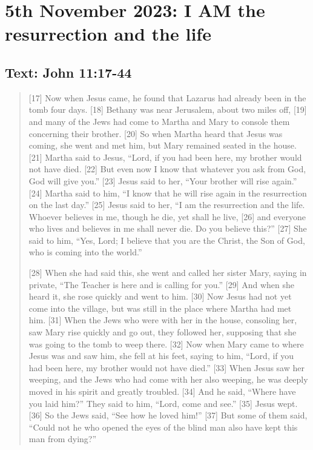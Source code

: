 \setcounter{figure}{0}

\section{5th November 2023: I AM the resurrection and the life}
\subsection*{Text: John 11:17-44}
  \begin{quote}
    [17] Now when Jesus came, he found that Lazarus had already been in the tomb four days. [18] Bethany was near Jerusalem, about two miles off, [19] and many of the Jews had come to Martha and Mary to console them concerning their brother. [20] So when Martha heard that Jesus was coming, she went and met him, but Mary remained seated in the house. [21] Martha said to Jesus, “Lord, if you had been here, my brother would not have died. [22] But even now I know that whatever you ask from God, God will give you.” [23] Jesus said to her, “Your brother will rise again.” [24] Martha said to him, “I know that he will rise again in the resurrection on the last day.” [25] Jesus said to her, “I am the resurrection and the life. Whoever believes in me, though he die, yet shall he live, [26] and everyone who lives and believes in me shall never die. Do you believe this?” [27] She said to him, “Yes, Lord; I believe that you are the Christ, the Son of God, who is coming into the world.”

    [28] When she had said this, she went and called her sister Mary, saying in private, “The Teacher is here and is calling for you.” [29] And when she heard it, she rose quickly and went to him. [30] Now Jesus had not yet come into the village, but was still in the place where Martha had met him. [31] When the Jews who were with her in the house, consoling her, saw Mary rise quickly and go out, they followed her, supposing that she was going to the tomb to weep there. [32] Now when Mary came to where Jesus was and saw him, she fell at his feet, saying to him, “Lord, if you had been here, my brother would not have died.” [33] When Jesus saw her weeping, and the Jews who had come with her also weeping, he was deeply moved in his spirit and greatly troubled. [34] And he said, “Where have you laid him?” They said to him, “Lord, come and see.” [35] Jesus wept. [36] So the Jews said, “See how he loved him!” [37] But some of them said, “Could not he who opened the eyes of the blind man also have kept this man from dying?”


\end{quote}
